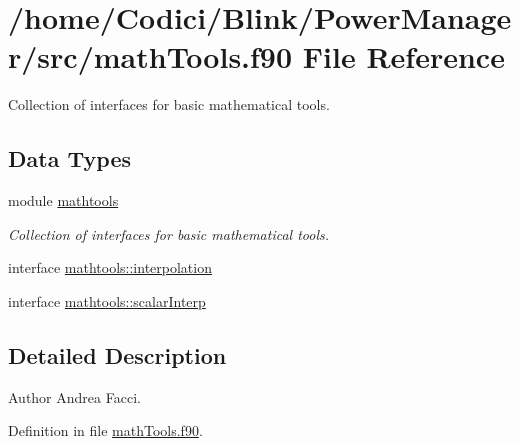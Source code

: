 \hypertarget{math_tools_8f90}{\section{/home/\-Codici/\-Blink/\-Power\-Manager/src/math\-Tools.f90 File Reference}
\label{math_tools_8f90}
}


Collection of interfaces for basic mathematical tools.  


\subsection*{Data Types}
\begin{DoxyCompactItemize}
\item 
module \hyperlink{classmathtools}{mathtools}
\begin{DoxyCompactList}\small\item\em Collection of interfaces for basic mathematical tools. \end{DoxyCompactList}\item 
interface \hyperlink{interfacemathtools_1_1interpolation}{mathtools\-::interpolation}
\item 
interface \hyperlink{interfacemathtools_1_1scalar_interp}{mathtools\-::scalar\-Interp}
\end{DoxyCompactItemize}


\subsection{Detailed Description}
\begin{DoxyAuthor}{Author}
Andrea Facci. 
\end{DoxyAuthor}


Definition in file \hyperlink{math_tools_8f90_source}{math\-Tools.\-f90}.

